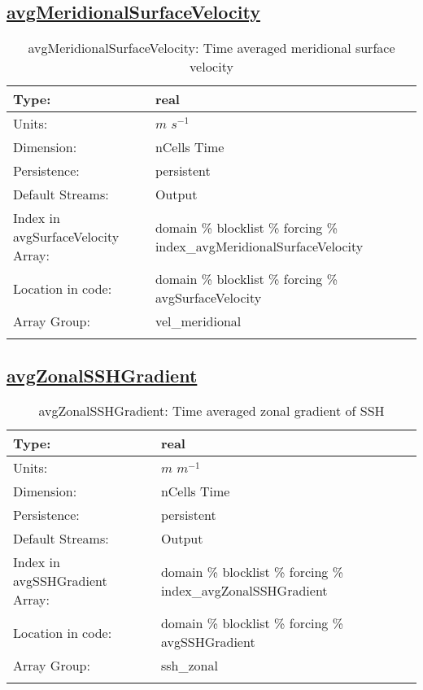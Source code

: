 \subsection[avgMeridionalSurfaceVelocity]{\hyperref[sec:var_tab_forcing]{avgMeridionalSurfaceVelocity}}
\label{subsec:var_sec_forcing_avgMeridionalSurfaceVelocity}
\begin{center}
\begin{longtable}{| p{2.0in} | p{4.0in} |}
        \hline 
        Type: & real \\
        \hline 
        Units: & $m$ $s^{-1}$ \\
        \hline 
        Dimension: & nCells Time \\
        \hline 
        Persistence: & persistent \\
        \hline 
		 Default Streams: & Output  \\
        \hline 
		 Index in avgSurfaceVelocity Array: & domain \% blocklist \% forcing \% index\_avgMeridionalSurfaceVelocity \\
		 \hline 
		 Location in code: & domain \% blocklist \% forcing \% avgSurfaceVelocity \\
		 \hline 
		 Array Group: & vel\_meridional \\
		 \hline 
    \caption{avgMeridionalSurfaceVelocity: Time averaged meridional surface velocity}
\end{longtable}
\end{center}
\subsection[avgZonalSSHGradient]{\hyperref[sec:var_tab_forcing]{avgZonalSSHGradient}}
\label{subsec:var_sec_forcing_avgZonalSSHGradient}
\begin{center}
\begin{longtable}{| p{2.0in} | p{4.0in} |}
        \hline 
        Type: & real \\
        \hline 
        Units: & $m$ $m^{-1}$ \\
        \hline 
        Dimension: & nCells Time \\
        \hline 
        Persistence: & persistent \\
        \hline 
		 Default Streams: & Output  \\
        \hline 
		 Index in avgSSHGradient Array: & domain \% blocklist \% forcing \% index\_avgZonalSSHGradient \\
		 \hline 
		 Location in code: & domain \% blocklist \% forcing \% avgSSHGradient \\
		 \hline 
		 Array Group: & ssh\_zonal \\
		 \hline 
    \caption{avgZonalSSHGradient: Time averaged zonal gradient of SSH}
\end{longtable}
\end{center}
